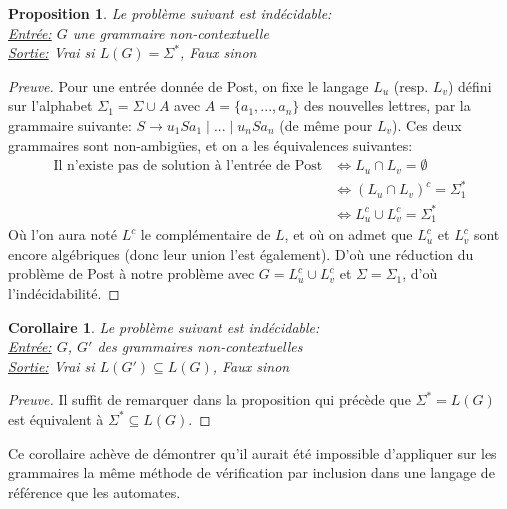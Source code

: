 \documentclass{article}
\newenvironment{preuve}{\begin{proof}[Preuve]}{\end{proof}}
\newtheorem{proposition}{Proposition}
\newtheorem{corollaire}{Corollaire}
\begin{document}
\begin{proposition}
    Le problème suivant est indécidable: \\
    \underline{Entrée:} $G$ une grammaire non-contextuelle \\
    \underline{Sortie:} Vrai si $L(G) = \Sigma^*$, Faux sinon
\end{proposition}

\begin{preuve}
    Pour une entrée donnée de Post, on fixe le langage $L_u$ (resp. $L_v$) défini
    sur l'alphabet $\Sigma_1 = \Sigma \cup A$ avec $A = \{a_1, ..., a_n\}$ des nouvelles lettres, par la grammaire suivante:
    $S \longrightarrow u_1 S a_1 \;|\; ... \;|\; u_n S a_n$ (de même pour $L_v$). Ces deux grammaires sont
    non-ambigües, et on a les équivalences suivantes:
    \begin{align*}
        \text{Il n'existe pas de solution à l'entrée de Post} & \iff L_u \cap L_v = \emptyset \\
                                                              & \iff (L_u \cap L_v)^c = \Sigma_1^* \\
                                                              & \iff L_u^c \cup L_v^c = \Sigma_1^*
    \end{align*} 
    Où l'on aura noté $L^c$ le complémentaire de $L$, et où on admet que
    $L_u^c$ et $L_v^c$ sont encore algébriques (donc leur union l'est également).
    D'où une réduction du problème de Post à notre problème avec $G = L_u^c \cup L_v^c$ et $\Sigma = \Sigma_1$, d'où l'indécidabilité.
\end{preuve}

\begin{corollaire}
    Le problème suivant est indécidable: \\
    \underline{Entrée:} $G$, $G'$ des grammaires non-contextuelles \\
    \underline{Sortie:} Vrai si $L(G') \subseteq L(G)$, Faux sinon
\end{corollaire}

\begin{preuve}
    Il suffit de remarquer dans la proposition qui précède que $\Sigma^* = L(G)$ est équivalent
    à $\Sigma^* \subseteq L(G)$.
\end{preuve}

Ce corollaire achève de démontrer qu'il aurait été impossible d'appliquer sur les grammaires
la même méthode de vérification par inclusion dans une langage de référence que les automates.
\end{document}
